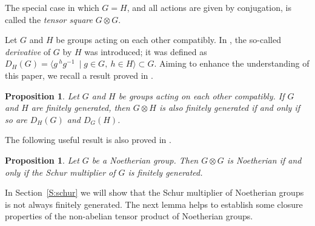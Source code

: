 \documentclass[12pt,reqno]{amsart}
\newtheorem{proposition}[subsection]{Proposition}
\theoremstyle{definition}
\numberwithin{equation}{section}
\theoremstyle{definition}
\begin{document}
The special case in which $G=H$, and all actions are given by conjugation, is called the \emph{tensor square} $G\otimes G$.

Let $G$ and $H$ be groups acting on each other compatibly. In \cite{Vi}, the so-called \emph{derivative} of $G$ by $H$ was introduced; it was defined as $D_H(G) =  \langle g \, ^hg^{-1} \ \mid g \in G,  \: h\in H\rangle\subset G$.
Aiming to enhance the understanding of this paper, we recall a result  proved in \cite{DLT}.

\begin{proposition}\label{paper5}
Let $G$ and $H$ be groups acting on each other compatibly. If $G$ and $H$ are finitely generated, then $G\otimes H$ is also finitely generated if and only if so are
$D_H(G)$ and $D_G(H)$.
\end{proposition}

The following useful result is also proved in \cite{DLT}.

\begin{proposition}\label{paper55} Let $G$ be a Noetherian group. Then $G \otimes G$ is Noetherian if and only if the Schur multiplier of $G$ is finitely generated.
\end{proposition}

In Section~\ref{S:schur} we will show that the Schur multiplier of Noetherian groups is not always finitely generated. The next lemma
helps to establish some closure properties of the non-abelian tensor product of Noetherian groups.
\end{document}
